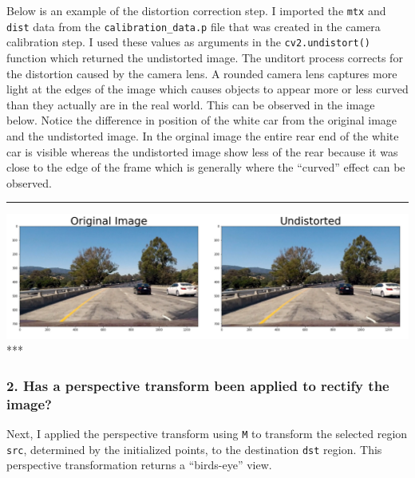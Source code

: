 \documentclass[11pt]{article}
\makeatletter
\def\maxwidth{\ifdim\Gin@nat@width>\linewidth\linewidth
    \else\Gin@nat@width\fi}
\let\Oldincludegraphics\includegraphics
\renewcommand{\includegraphics}[1]{\Oldincludegraphics[width=.8\maxwidth]{#1}}
\makeatother
\begin{document}
Below is an example of the distortion correction step. I imported the
\texttt{mtx} and \texttt{dist} data from the
\texttt{calibration\_data.p} file that was created in the camera
calibration step. I used these values as arguments in the
\texttt{cv2.undistort()} function which returned the undistorted image.
The unditort process corrects for the distortion caused by the camera
lens. A rounded camera lens captures more light at the edges of the
image which causes objects to appear more or less curved than they
actually are in the real world. This can be observed in the image below.
Notice the difference in position of the white car from the original
image and the undistorted image. In the orginal image the entire rear
end of the white car is visible whereas the undistorted image show less
of the rear because it was close to the edge of the frame which is
generally where the ``curved'' effect can be observed.

\begin{center}\rule{0.5\linewidth}{\linethickness}\end{center}

\includegraphics{./output_images/writeup_images/test1_undist.png} ***

    \hypertarget{has-a-perspective-transform-been-applied-to-rectify-the-image}{%
\subsubsection{2. Has a perspective transform been applied to rectify
the
image?}\label{has-a-perspective-transform-been-applied-to-rectify-the-image}}

Next, I applied the perspective transform using \texttt{M} to transform
the selected region \texttt{src}, determined by the initialized points,
to the destination \texttt{dst} region. This perspective transformation
returns a ``birds-eye'' view.
\end{document}
